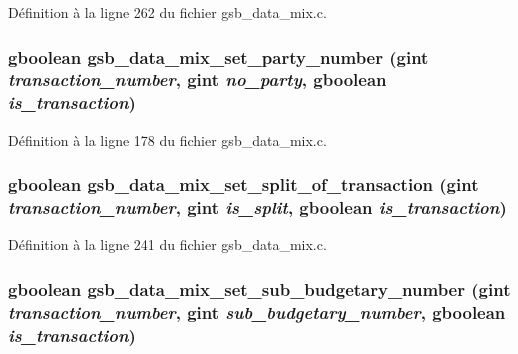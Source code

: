 Définition à la ligne 262 du fichier gsb\_\-data\_\-mix.c.

\subsubsection[{gsb\_\-data\_\-mix\_\-set\_\-party\_\-number}]{\setlength{\rightskip}{0pt plus 5cm}gboolean gsb\_\-data\_\-mix\_\-set\_\-party\_\-number (gint {\em transaction\_\-number}, \/  gint {\em no\_\-party}, \/  gboolean {\em is\_\-transaction})}\label{gsb__data__mix_8h_aaf3ff9d5cd9e6b540aca93e7b1bdf236}


Définition à la ligne 178 du fichier gsb\_\-data\_\-mix.c.

\subsubsection[{gsb\_\-data\_\-mix\_\-set\_\-split\_\-of\_\-transaction}]{\setlength{\rightskip}{0pt plus 5cm}gboolean gsb\_\-data\_\-mix\_\-set\_\-split\_\-of\_\-transaction (gint {\em transaction\_\-number}, \/  gint {\em is\_\-split}, \/  gboolean {\em is\_\-transaction})}\label{gsb__data__mix_8h_ac0d0557f4d82e2072a4059751c163ffa}


Définition à la ligne 241 du fichier gsb\_\-data\_\-mix.c.

\subsubsection[{gsb\_\-data\_\-mix\_\-set\_\-sub\_\-budgetary\_\-number}]{\setlength{\rightskip}{0pt plus 5cm}gboolean gsb\_\-data\_\-mix\_\-set\_\-sub\_\-budgetary\_\-number (gint {\em transaction\_\-number}, \/  gint {\em sub\_\-budgetary\_\-number}, \/  gboolean {\em is\_\-transaction})}\label{gsb__data__mix_8h_a6166a76f93e77b6bafd43afb1ed616ad}


